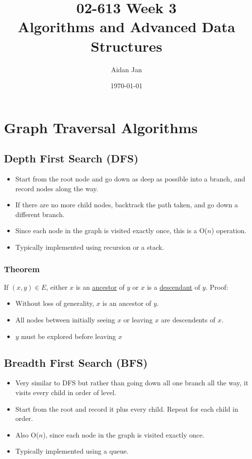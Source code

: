 \documentclass[10pt]{article}
\title{02-613 Week 3 \\ \large{Algorithms and Advanced Data Structures}}
\author{Aidan Jan}
\date{\today}
\begin{document}
\maketitle

\section*{Graph Traversal Algorithms}
\subsection*{Depth First Search (DFS)}
\begin{itemize}
	\item Start from the root node and go down as deep as possible into a branch, and record nodes along the way.
	\item If there are no more child nodes, backtrack the path taken, and go down a different branch.
	\item Since each node in the graph is visited exactly once, this is a O($n$) operation.
	\item Typically implemented using recursion or a stack.
\end{itemize}

\subsubsection*{Theorem}
If $(x, y) \in E$, either $x$ is an \underline{ancestor} of $y$ or $x$ is a \underline{descendant} of $y$.  Proof:
\begin{itemize}
	\item Without loss of generality, $x$ is an ancestor of $y$. 
	\item All nodes between initially seeing $x$ or leaving $x$ are descendents of $x$.
	\item $y$ must be explored before leaving $x$
\end{itemize}

\subsection*{Breadth First Search (BFS)}
\begin{itemize}
	\item Very similar to DFS but rather than going down all one branch all the way, it visits every child in order of level.
	\item Start from the root and record it plus every child.  Repeat for each child in order.
	\item Also O($n$), since each node in the graph is visited exactly once.
	\item Typically implemented using a queue.
\end{itemize}
\end{document}
